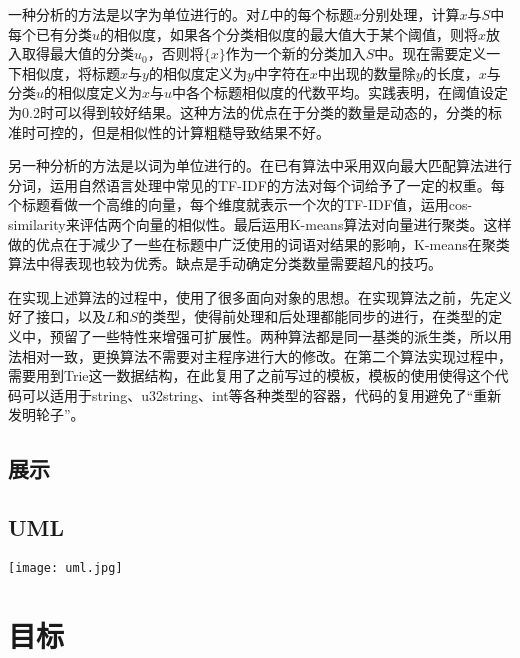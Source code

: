 \documentclass[12pt]{article}
\begin{document}
一种分析的方法是以字为单位进行的。对$L$中的每个标题$x$分别处理，计算$x$与$S$中每个已有分类$u$的相似度，如果各个分类相似度的最大值大于某个阈值，则将$x$放入取得最大值的分类$u_0$，否则将$\lbrace x\rbrace$作为一个新的分类加入$S$中。现在需要定义一下相似度，将标题$x$与$y$的相似度定义为$y$中字符在$x$中出现的数量除$y$的长度，$x$与分类$u$的相似度定义为$x$与$u$中各个标题相似度的代数平均。实践表明，在阈值设定为0.2时可以得到较好结果。这种方法的优点在于分类的数量是动态的，分类的标准时可控的，但是相似性的计算粗糙导致结果不好。

另一种分析的方法是以词为单位进行的。在已有算法中采用双向最大匹配算法进行分词，运用自然语言处理中常见的TF-IDF的方法对每个词给予了一定的权重。每个标题看做一个高维的向量，每个维度就表示一个次的TF-IDF值，运用cos-similarity来评估两个向量的相似性。最后运用K-means算法对向量进行聚类。这样做的优点在于减少了一些在标题中广泛使用的词语对结果的影响，K-means在聚类算法中得表现也较为优秀。缺点是手动确定分类数量需要超凡的技巧。

在实现上述算法的过程中，使用了很多面向对象的思想。在实现算法之前，先定义好了接口，以及$L$和$S$的类型，使得前处理和后处理都能同步的进行，在类型的定义中，预留了一些特性来增强可扩展性。两种算法都是同一基类的派生类，所以用法相对一致，更换算法不需要对主程序进行大的修改。在第二个算法实现过程中，需要用到Trie这一数据结构，在此复用了之前写过的模板，模板的使用使得这个代码可以适用于string、u32string、int等各种类型的容器，代码的复用避免了“重新发明轮子”。
\subsection{展示}
\subsection{UML}
\begin{center}
\texttt{[image: uml.jpg]}
\end{center}
\section{目标}
\end{document}
